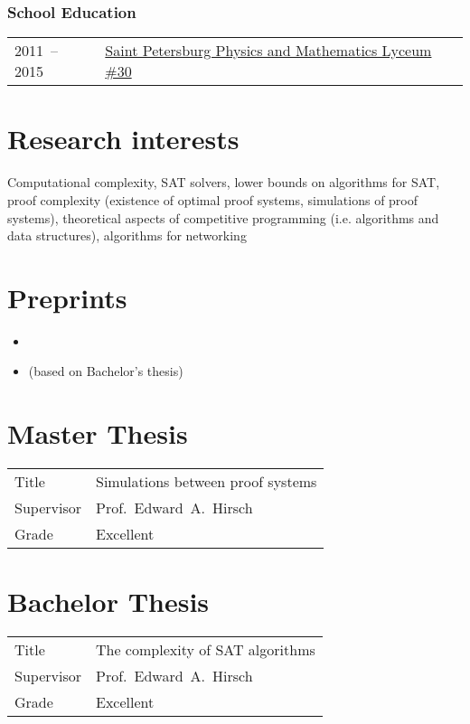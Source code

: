\documentclass[a4paper, 11pt]{article}
\begin{document}
\subsubsection*{School Education}

\begin{tabularx}{\textwidth}{lX}
	2011~-- 2015 & \href{http://www.school30.spb.ru/}{Saint Petersburg Physics and Mathematics Lyceum \#30}
\end{tabularx}


\section*{Research interests}

Computational complexity, SAT solvers, lower bounds on algorithms for SAT, proof complexity (existence of optimal proof systems, simulations of proof systems), theoretical aspects of competitive programming (i.e. algorithms and data structures), algorithms for networking

\section*{Preprints}

\begin{itemize}
	\item {}
	\item {} (based on Bachelor's thesis)
\end{itemize}

\section*{Master Thesis}

\begin{tabularx}{\textwidth}{lX}
	Title & Simulations between proof systems \\
	Supervisor & Prof.~Edward~A.~Hirsch \\
	Grade & Excellent
\end{tabularx}

\section*{Bachelor Thesis}

\begin{tabularx}{\textwidth}{lX}
	Title & The complexity of SAT algorithms \\
	Supervisor & Prof.~Edward~A.~Hirsch \\
	Grade & Excellent
\end{tabularx}
\end{document}

